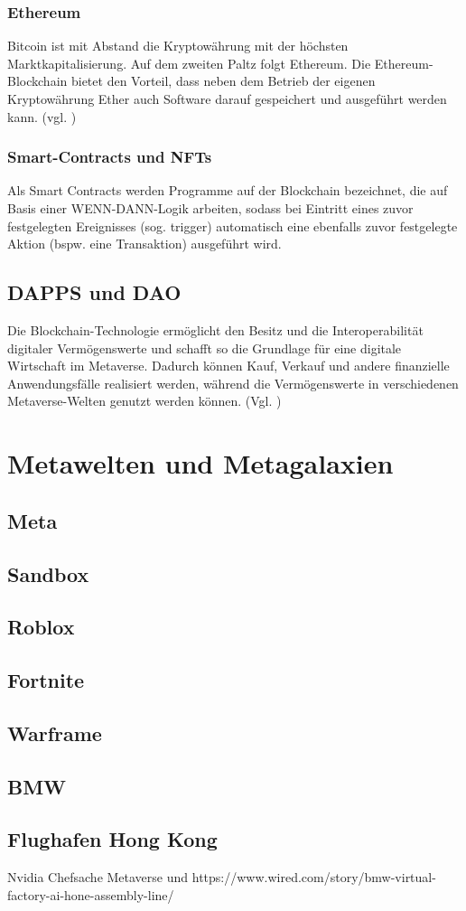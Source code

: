 \subsubsection{Ethereum}

Bitcoin ist mit Abstand die Kryptowährung mit der höchsten Marktkapitalisierung. Auf dem zweiten Paltz folgt Ethereum. \cite{MarketCap} Die Ethereum-Blockchain bietet den Vorteil, dass neben dem Betrieb der eigenen Kryptowährung Ether auch Software darauf gespeichert und ausgeführt werden kann. (vgl. \cite{Blockchain}) 


\subsubsection{Smart-Contracts und NFTs}
\glqq Als Smart Contracts werden Programme auf der Blockchain bezeichnet, die auf Basis einer WENN-DANN-Logik arbeiten, sodass bei Eintritt eines zuvor festgelegten Ereignisses (sog. trigger) automatisch eine ebenfalls zuvor festgelegte Aktion (bspw. eine Transaktion) ausgeführt wird.\grqq{} \cite{SmartConDef}


\subsection{DAPPS und DAO}

Die Blockchain-Technologie ermöglicht den Besitz und die Interoperabilität digitaler Vermögenswerte und schafft so die Grundlage für eine digitale Wirtschaft im Metaverse. Dadurch können Kauf, Verkauf und andere finanzielle Anwendungsfälle realisiert werden, während die Vermögenswerte in verschiedenen Metaverse-Welten genutzt werden können. (Vgl. \cite{tech})
\section{Metawelten und Metagalaxien}




\subsection{Meta}
\subsection{Sandbox}
\subsection{Roblox}
\subsection{Fortnite}
\subsection{Warframe}
\subsection{BMW}
\subsection{Flughafen Hong Kong}
Nvidia Chefsache Metaverse und https://www.wired.com/story/bmw-virtual-factory-ai-hone-assembly-line/